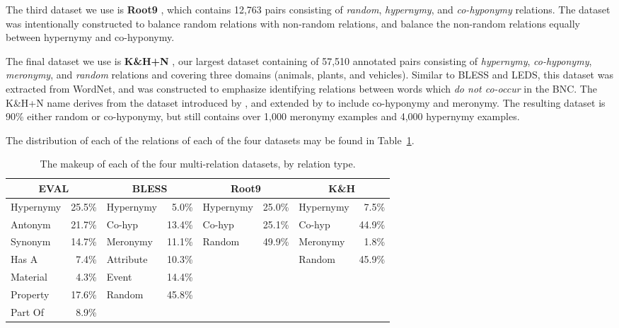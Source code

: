 The third dataset we use is {\bf Root9} \cite{santus:2016:lrec}, which contains
12,763 pairs consisting of {\em random}, {\em hypernymy}, and {\em co-hyponymy}
relations. The dataset was intentionally constructed to balance random
relations with non-random relations, and balance the non-random relations
equally between hypernymy and co-hyponymy.

The final dataset we use is {\bf K\&H+N} \cite{necsulescu:2015:starsem}, our
largest dataset containing of 57,510 annotated pairs consisting of {\em
hypernymy}, {\em co-hyponymy}, {\em meronymy}, and {\em random} relations and
covering three domains (animals, plants, and vehicles). Similar to BLESS and
LEDS, this dataset was extracted from WordNet, and was constructed to emphasize
identifying relations between words which {\em do not co-occur} in the BNC. The
K\&H+N name derives from the dataset introduced by ,
and extended by  to include co-hyponymy
and meronymy.  The resulting dataset is 90\% either random or co-hyponymy, but
still contains over 1,000 meronymy examples and 4,000 hypernymy examples.

The distribution of each of the relations of each of the four datasets may
be found in Table~\ref{tab:multimakeup}.

\begin{table}
\centering
\begin{footnotesize}
\begin{tabular}{|lr|lr|lr|lr|}
  \hline
  \multicolumn{2}{|c|}{{\bf EVAL}} & \multicolumn{2}{c|}{{\bf BLESS}} & \multicolumn{2}{c|}{{\bf Root9}} & \multicolumn{2}{c|}{{\bf K\&H}}\\
  \hline
  \hline
  Hypernymy & 25.5\% & Hypernymy   &  5.0\% & Hypernymy   & 25.0\% & Hypernymy   &  7.5\% \\
  Antonym   & 21.7\% & Co-hyp      & 13.4\% & Co-hyp      & 25.1\% & Co-hyp      & 44.9\% \\
  Synonym   & 14.7\% & Meronymy    & 11.1\% & Random      & 49.9\% & Meronymy    &  1.8\% \\
  Has A     &  7.4\% & Attribute   & 10.3\% &             &        & Random      & 45.9\% \\
  Material  &  4.3\% & Event       & 14.4\% &             &        &             &        \\
  Property  & 17.6\% & Random      & 45.8\% &             &        &             &        \\
  Part Of   &  8.9\% &             &        &             &        &             &        \\
  \hline
\end{tabular}
\end{footnotesize}
\caption{The makeup of each of the four multi-relation datasets, by relation type.}
\label{tab:multimakeup}
\end{table}

